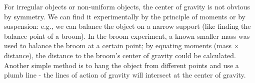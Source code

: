 For irregular objects or non-uniform objects, the center of gravity is not obvious by symmetry. We can find it experimentally by
the principle of moments or by suspension: e.g., we can balance the object on a narrow support (like finding the balance point of
a broom). In the broom experiment, a known smaller mass was used to balance the broom at a certain point; by equating moments
(mass $\times$ distance), the distance to the broom's center of gravity could be calculated. Another simple method is to hang the
object from different points and use a plumb line - the lines of action of gravity will intersect at the center of gravity.